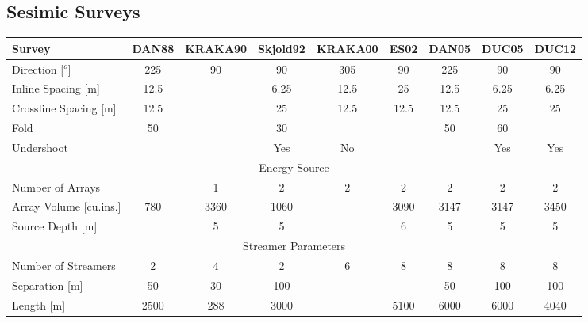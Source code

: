 \begin{landscape}
\section*{Sesimic Surveys}
\begin{table}
    \begin{tabular}{|l|c|c|c|c|c|c|c|c|}
    \hline
    \cellcolor[HTML]{C0C0C0}Survey                    & \cellcolor[HTML]{C0C0C0}DAN88 & \cellcolor[HTML]{C0C0C0}KRAKA90 & \cellcolor[HTML]{C0C0C0}Skjold92 & \cellcolor[HTML]{C0C0C0}KRAKA00 & \cellcolor[HTML]{C0C0C0}ES02 & \cellcolor[HTML]{C0C0C0}DAN05 & \cellcolor[HTML]{C0C0C0}DUC05 & \cellcolor[HTML]{C0C0C0}DUC12 \\ \hline
    Direction [$^o$]       & 225   & 90      & 90       & 305     & 90   & 225   & 90    & 90    \\ \hline
    Inline Spacing [m]        & 12.5  & ~       & 6.25     & 12.5    & 25   & 12.5  & 6.25  & 6.25  \\ \hline
    Crossline Spacing [m]     & 12.5  & ~       & 25       & 12.5    & 12.5 & 12.5  & 25    & 25    \\ \hline
    Fold                      & 50    & ~       & 30       & ~       & ~    & 50    & 60    & ~     \\ \hline
    Undershoot                & ~     & ~       & Yes      & No      & ~    & ~     & Yes   & Yes   \\ \hline
    \multicolumn{9}{|c|}{\cellcolor[HTML]{C0C0C0} Energy Source}    \\ \hline
    Number of Arrays          & ~     & 1       & 2        & 2       & 2    & 2     & 2     & 2     \\\hline
    Array Volume [cu.ins.]    & 780   & 3360    & 1060     & ~       & 3090 & 3147  & 3147  & 3450  \\ \hline
    Source Depth [m]          & ~     & 5       & 5        & ~       & 6    & 5     & 5     & 5     \\ \hline
    \multicolumn{9}{|c|}{\cellcolor[HTML]{C0C0C0}     Streamer Parameters       }    \\ \hline
    Number of Streamers       & 2     & 4       & 2        & 6       & 8    & 8     & 8     & 8     \\ \hline
    Separation [m]            & 50    & 30      & 100      & ~       & ~    & 50    & 100   & 100   \\ \hline
    Length [m]                & 2500  & 288     & 3000     & ~       & 5100 & 6000  & 6000  & 4040  \\ \hline

\end{tabular}
\end{table}
\end{landscape}
